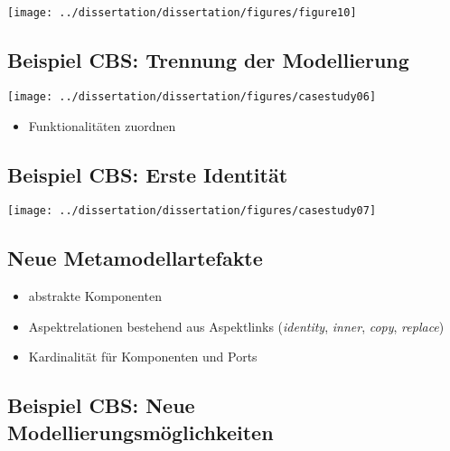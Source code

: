 	\begin{frame}{\insertsectionhead}{\insertsubsectionhead}
		\hfil\texttt{[image: ../dissertation/dissertation/figures/figure10]}\hfil
	\end{frame}

	\subsection{Beispiel CBS: Trennung der Modellierung}

	\begin{frame}{\insertsectionhead}{\insertsubsectionhead}
		\hfil\texttt{[image: ../dissertation/dissertation/figures/casestudy06]}\hfil
	\end{frame}

	\begin{itemize}
		\item Funktionalitäten zuordnen
	\end{itemize}

	\subsection{Beispiel CBS: Erste Identität}

	\begin{frame}{\insertsectionhead}{\insertsubsectionhead}
		\hfil\texttt{[image: ../dissertation/dissertation/figures/casestudy07]}\hfil
	\end{frame}

	\subsection{Neue Metamodellartefakte}

	\begin{frame}{\insertsectionhead}{\insertsubsectionhead}
		\begin{itemize}
			\item abstrakte Komponenten
			\item Aspektrelationen bestehend aus Aspektlinks (\textit{identity}, \textit{inner}, \textit{copy}, \textit{replace})
			\item Kardinalität für Komponenten und Ports
		\end{itemize}
	\end{frame}

	\subsection{Beispiel CBS: Neue Modellierungsmöglichkeiten}

